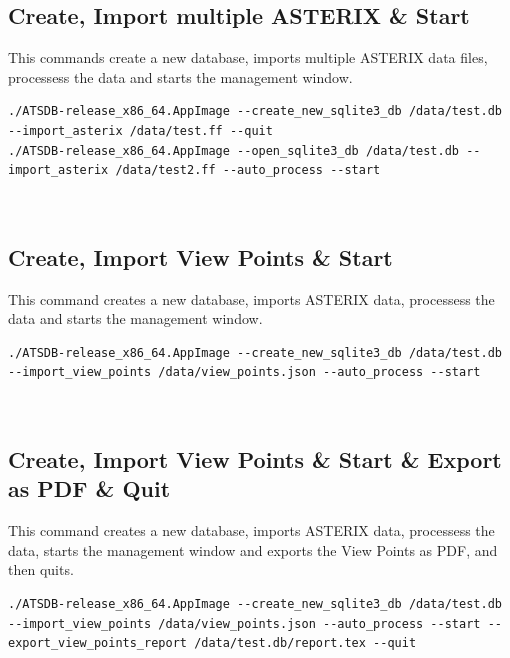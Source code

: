 \subsection{Create, Import multiple ASTERIX \& Start}

This commands create a new database, imports multiple ASTERIX data files, processess the data and starts the management window.

\begin{lstlisting}
./ATSDB-release_x86_64.AppImage --create_new_sqlite3_db /data/test.db --import_asterix /data/test.ff --quit
./ATSDB-release_x86_64.AppImage --open_sqlite3_db /data/test.db --import_asterix /data/test2.ff --auto_process --start
\end{lstlisting}
\ \\

\subsection{Create, Import View Points \& Start}

This command creates a new database, imports ASTERIX data, processess the data and starts the management window.

\begin{lstlisting}
./ATSDB-release_x86_64.AppImage --create_new_sqlite3_db /data/test.db --import_view_points /data/view_points.json --auto_process --start
\end{lstlisting}
\ \\

\subsection{Create, Import View Points \& Start \& Export as PDF \& Quit}

This command creates a new database, imports ASTERIX data, processess the data, starts the management window and exports the View Points as PDF, and then quits.

\begin{lstlisting}
./ATSDB-release_x86_64.AppImage --create_new_sqlite3_db /data/test.db --import_view_points /data/view_points.json --auto_process --start --export_view_points_report /data/test.db/report.tex --quit
\end{lstlisting}
\ \\

